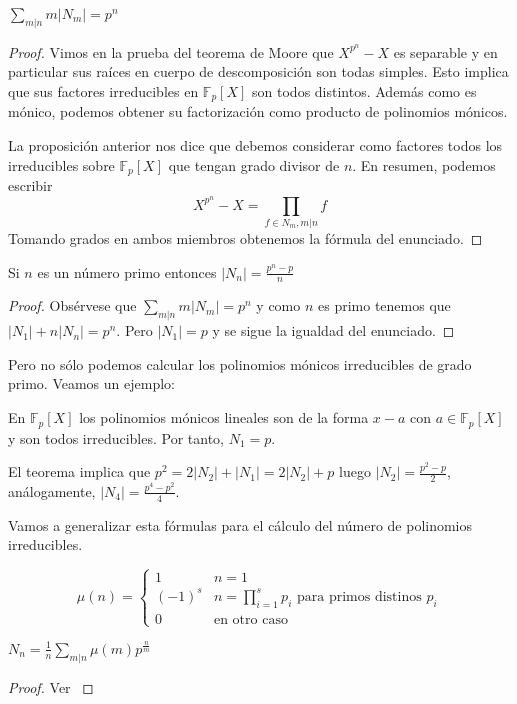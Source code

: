 \begin{proposition}
	$\sum_{m|n} m |N_m| = p^n$
\end{proposition}
\begin{proof}
	Vimos en la prueba del teorema de Moore que $X^{p^n} - X$ es separable y en particular sus raíces en cuerpo de descomposición son todas simples. Esto implica que sus factores irreducibles en $\mathbb{F}_p[X]$ son todos distintos. Además como es mónico, podemos obtener su factorización como producto de polinomios mónicos. 
	
	La proposición anterior nos dice que debemos considerar como factores todos los irreducibles sobre $\mathbb{F}_p[X]$ que tengan grado divisor de $n$. En resumen, podemos escribir $$X^{p^n} - X = \prod_{f \in N_m, m|n} f$$ Tomando grados en ambos miembros obtenemos la fórmula del enunciado. 
\end{proof}

\begin{corollary}
	Si $n$ es un número primo entonces $|N_n| = \frac{p^n-p}{n}$
\end{corollary}
\begin{proof}
	Obsérvese que $\sum_{m|n} m |N_m| = p^n$ y como $n$ es primo tenemos que $|N_1| + n|N_n| = p^n$. Pero $|N_1| = p$ y se sigue la igualdad del enunciado. 
\end{proof}

Pero no sólo podemos calcular los polinomios mónicos irreducibles de grado primo. Veamos un ejemplo:

\begin{example}
	En $\mathbb{F}_p[X]$ los polinomios mónicos lineales son de la forma $x-a$ con $a \in \mathbb{F}_p[X]$ y son todos irreducibles. Por tanto, $N_1 = p$.
	
	El teorema implica que $p^2 = 2 |N_2| + |N_1| = 2 |N_2| + p$ luego $|N_2| = \frac{p^2 - p}{2}$, análogamente, $|N_4| = \frac{p^4 - p^2}{4}$.
\end{example}

Vamos a generalizar esta fórmulas para el cálculo del número de polinomios irreducibles. 

\begin{definition}
	\[
	\mu(n) = 
	\begin{cases} 
	1 & n = 1 \\
	(-1)^s & n = \prod_{i = 1}^s p_i  \text{ para primos distinos } p_i \\
	0   & \text{en otro caso}
	\end{cases}
	\]
\end{definition}


\begin{theorem}
	$N_n = \frac{1}{n} \sum_{m|n} \mu(m) p^{\frac{n}{m}}$
\end{theorem}
\begin{proof}
	Ver \cite{counting-irreducible}
\end{proof}




